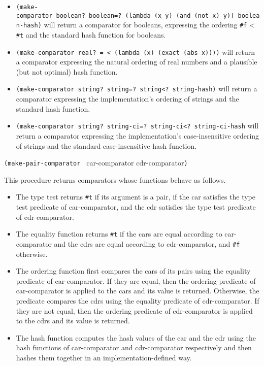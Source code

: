 \begin{itemize}
\item
  \texttt{(make-comparator\ boolean?\ boolean=?\ (lambda\ (x\ y)\ (and\ (not\ x)\ y))\ boolean-hash)}
  will return a comparator for booleans, expressing the ordering
  \texttt{\#f} \textless{} \texttt{\#t} and the standard hash function
  for booleans.
\item
  \texttt{(make-comparator\ real?\ =\ \textless{}\ (lambda\ (x)\ (exact\ (abs\ x))))}
  will return a comparator expressing the natural ordering of real
  numbers and a plausible (but not optimal) hash function.
\item
  \texttt{(make-comparator\ string?\ string=?\ string\textless{}?\ string-hash)}
  will return a comparator expressing the implementation's ordering of
  strings and the standard hash function.
\item
  \texttt{(make-comparator\ string?\ string-ci=?\ string-ci\textless{}?\ string-ci-hash}
  will return a comparator expressing the implementation's
  case-insensitive ordering of strings and the standard case-insensitive
  hash function.
\end{itemize}

\texttt{(make-pair-comparator\ } car-comparator cdr-comparator\texttt{)}

This procedure returns comparators whose functions behave as follows.

\begin{itemize}
\item
  The type test returns \texttt{\#t} if its argument is a pair, if the
  car satisfies the type test predicate of car-comparator, and the cdr
  satisfies the type test predicate of cdr-comparator.
\item
  The equality function returns \texttt{\#t} if the cars are equal
  according to car-comparator and the cdrs are equal according to
  cdr-comparator, and \texttt{\#f} otherwise.
\item
  The ordering function first compares the cars of its pairs using the
  equality predicate of car-comparator. If they are equal, then the
  ordering predicate of car-comparator is applied to the cars and its
  value is returned. Otherwise, the predicate compares the cdrs using
  the equality predicate of cdr-comparator. If they are not equal, then
  the ordering predicate of cdr-comparator is applied to the cdrs and
  its value is returned.
\item
  The hash function computes the hash values of the car and the cdr
  using the hash functions of car-comparator and cdr-comparator
  respectively and then hashes them together in an
  implementation-defined way.
\end{itemize}

